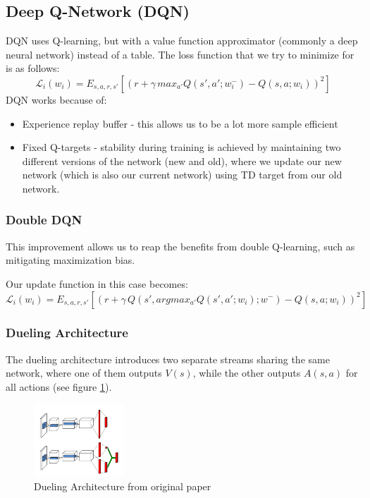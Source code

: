 \documentclass[11pt]{article} %
\begin{document}
\subsection{Deep Q-Network (DQN)}
DQN uses Q-learning, but with a value function approximator (commonly a deep neural network) instead of a table. The loss function that we try to minimize for is as follows:
\begin{equation*}
    \mathcal{L}_i(w_i) = E_{s, a, r, s'}[(r + \gamma\,max_{a'}Q(s', a'; w_i^-) - Q(s, a; w_i))^2]
\end{equation*}
DQN works because of:
\begin{itemize}
    \item Experience replay buffer - this allows us to be a lot more sample efficient 
    \item Fixed Q-targets - stability during training is achieved by maintaining two different versions of the network (new and old), where we update our new network (which is also our current network) using TD target from our old network. 
\end{itemize}
\subsubsection{Double DQN}
This improvement allows us to reap the benefits from double Q-learning, such as mitigating maximization bias.

Our update function in this case becomes:
\begin{equation*}
    \mathcal{L}_i(w_i) = E_{s, a, r, s'}[(r + \gamma\,Q(s', argmax_{a'}Q(s', a'; w_i); w^-) - Q(s, a; w_i))^2]
\end{equation*}

\subsubsection{Dueling Architecture}
The dueling architecture introduces two separate streams sharing the same network, where one of them outputs $V(s)$, while the other outputs $A(s,a)$ for all actions (see figure \ref{fig:duelingarch}).

\begin{figure}
  \begin{center}
    \includegraphics[width=0.3\textwidth]{images/duelingarch.png}
  \end{center}
  \caption{Dueling Architecture from original paper}
  \label{fig:duelingarch}
\end{figure}
\end{document}
